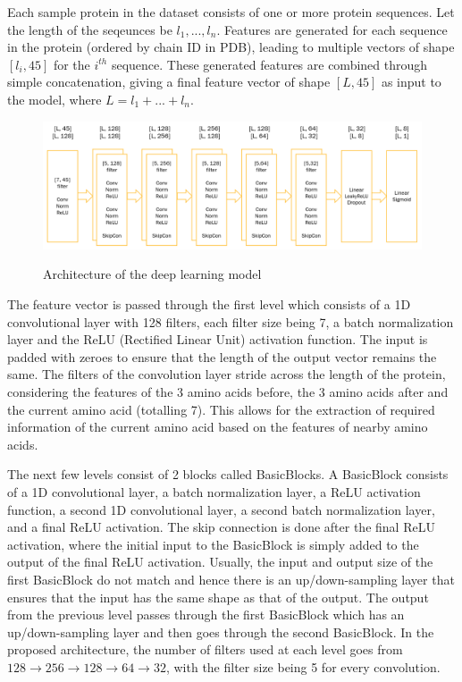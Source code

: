 \documentclass[journal=jacsat,manuscript=article]{achemso}
\begin{document}
Each sample protein in the dataset consists of one or more protein sequences. Let the length of the seqeunces be $l_1, ..., l_n$. Features are generated for each sequence in the protein (ordered by chain ID in PDB), leading to multiple vectors of shape $[l_i, 45]$ for the $i^{th}$ sequence. These generated features are combined through simple concatenation, giving a final feature vector of shape $[L, 45]$ as input to the model, where $L = l_1 + ... + l_n$.

\begin{figure}
    \caption{\centering Architecture of the deep learning model}
    \centering
    \noindent\includegraphics[scale=0.37]{architecture}
    \label{fig:architecture}
\end{figure}

The feature vector is passed through the first level which consists of a 1D convolutional layer with 128 filters, each filter size being 7, a batch normalization layer and the ReLU (Rectified Linear Unit) activation function. The input is padded with zeroes to ensure that the length of the output vector remains the same. The filters of the convolution layer stride across the length of the protein, considering the features of the 3 amino acids before, the 3 amino acids after and the current amino acid (totalling 7). This allows for the extraction of required information of the current amino acid based on the features of nearby amino acids.

The next few levels consist of 2 blocks called BasicBlocks. A BasicBlock consists of a 1D convolutional layer, a batch normalization layer, a ReLU activation function, a second 1D convolutional layer, a second batch normalization layer, and a final ReLU activation. The skip connection is done after the final ReLU activation, where the initial input to the BasicBlock is simply added to the output of the final ReLU activation. Usually, the input and output size of the first BasicBlock do not match and hence there is an up/down-sampling layer that ensures that the input has the same shape as that of the output. The output from the previous level passes through the first BasicBlock which has an up/down-sampling layer and then goes through the second BasicBlock. In the proposed architecture, the number of filters used at each level goes from $128 \to 256 \to 128 \to 64 \to 32$, with the filter size being 5 for every convolution.
\end{document}
